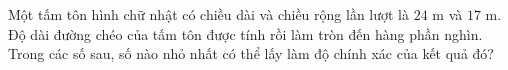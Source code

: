 \begin{ex}
Một tấm tôn hình chữ nhật có chiều dài và chiều rộng lần lượt là $24$ m và $17$ m. Độ dài đường chéo của tấm tôn được tính rồi làm tròn đến hàng phần nghìn. Trong các số sau, số nào nhỏ nhất có thể lấy làm độ chính xác của kết quả đó?
\end{ex}
